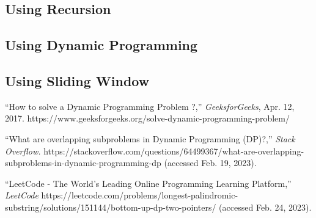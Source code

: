 	\subsection*{Using Recursion}
	
	\subsection*{Using Dynamic Programming}
	
	\subsection*{Using Sliding Window}
	
	
	\newpage
	\begin{thebibliography}{999}		
		
		“How to solve a Dynamic Programming Problem ?,” \emph{GeeksforGeeks}, Apr. 12, 2017. https://www.geeksforgeeks.org/solve-dynamic-programming-problem/
		
		“What are overlapping subproblems in Dynamic Programming (DP)?,”
		\emph{Stack Overflow.} https://stackoverflow.com/questions/64499367/what-are-overlapping-subproblems-in-dynamic-programming-dp (accessed Feb. 19, 2023).
		
		“LeetCode - The World’s Leading Online Programming Learning Platform,”
		\emph{LeetCode}
		https://leetcode.com/problems/longest-palindromic-substring/solutions/151144/bottom-up-dp-two-pointers/ (accessed Feb. 24, 2023).
		
		
	\end{thebibliography}
	
